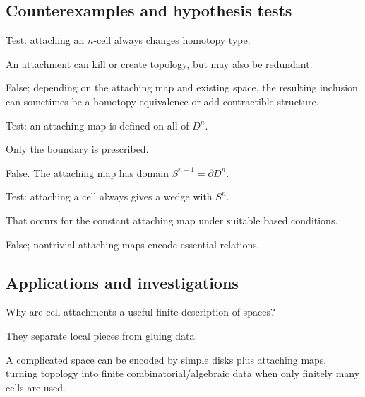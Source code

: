 \subsection*{Counterexamples and hypothesis tests}

\begin{exercise}\label{exr:viii05-ped-10}
Test: attaching an $n$-cell always changes homotopy type.
\end{exercise}
\begin{hint}
An attachment can kill or create topology, but may also be redundant.
\end{hint}
\begin{solution}
False; depending on the attaching map and existing space, the resulting inclusion can sometimes be a homotopy equivalence or add contractible structure.
\end{solution}

\begin{exercise}\label{exr:viii05-ped-11}
Test: an attaching map is defined on all of $D^n$.
\end{exercise}
\begin{hint}
Only the boundary is prescribed.
\end{hint}
\begin{solution}
False.  The attaching map has domain $S^{n-1}=\partial D^n$.
\end{solution}

\begin{exercise}\label{exr:viii05-ped-12}
Test: attaching a cell always gives a wedge with $S^n$.
\end{exercise}
\begin{hint}
That occurs for the constant attaching map under suitable based conditions.
\end{hint}
\begin{solution}
False; nontrivial attaching maps encode essential relations.
\end{solution}

\subsection*{Applications and investigations}

\begin{exercise}\label{exr:viii05-ped-13}
Why are cell attachments a useful finite description of spaces?
\end{exercise}
\begin{hint}
They separate local pieces from gluing data.
\end{hint}
\begin{solution}
A complicated space can be encoded by simple disks plus attaching maps, turning topology into finite combinatorial/algebraic data when only finitely many cells are used.
\end{solution}

